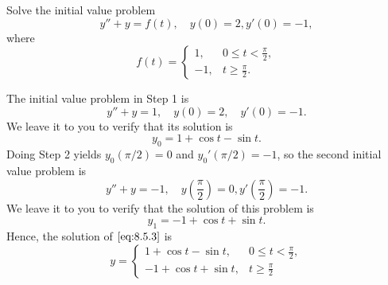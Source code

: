 \documentclass{ximera}
\begin{document}
\begin{example}\label{example:8.5.1}
Solve the initial value problem
\begin{equation}\label{eq:8.5.3}
y''+y=f(t),
\quad   y(0)=2,  y'(0)=-1,
\end{equation}
where
$$
f(t)=\left\{\begin{array}{rl}
1,&0\leq t<\frac{\pi}{2},\\
-1,&t\geq \frac{\pi}{2}.
\end{array}\right.
$$
\begin{explanation}
The initial value problem in Step 1 is
$$
y''+y=1, \quad   y(0)=2,\quad y'(0)=-1.
$$
We leave it to you to verify that its solution is
$$
y_0=1+\cos t-\sin t.
$$
Doing Step 2 yields
 $y_0(\pi/2)=0$ and $y_0'(\pi/2)=-1$,
so the second initial value problem is
$$
y''+y=-1, \quad  y\left(\frac{\pi}{2}\right)=0, y'\left(\frac{\pi}{2}\right)=-1.
$$
We leave it to you to verify that the solution of this problem
is
$$
y_1=-1+\cos t+\sin t.
$$
Hence, the solution of $\eqref{eq:8.5.3}$ is
\begin{equation}\label{eq:8.5.4}
y=\left\{\begin{array}{rl}
1+\cos t-\sin t,&0\leq t<\frac{\pi}{2},
\\
-1+\cos t+\sin t,&t\geq \frac{\pi}{2}
\end{array}\right.
\end{equation}

\begin{center}
\end{center}


\end{explanation}
\end{example}
\end{document}
